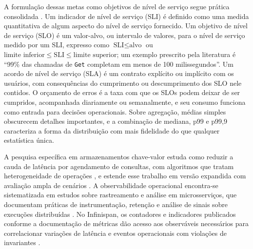 A formulação dessas metas como objetivos de nível de serviço segue prática consolidada \citep{google_sre_slo}. Um indicador de nível de serviço (SLI) é definido como uma medida quantitativa de algum aspecto do nível de serviço fornecido. Um objetivo de nível de serviço (SLO) é um valor-alvo, ou intervalo de valores, para o nível de serviço medido por um SLI, expresso como $\text{SLI} \le \text{alvo}$ ou $\text{limite inferior} \le \text{SLI} \le \text{limite superior}$; um exemplo prescrito pela literatura é ``99\% das chamadas de \texttt{Get} completam em menos de 100 milissegundos''. Um acordo de nível de serviço (SLA) é um contrato explícito ou implícito com os usuários, com consequências do cumprimento ou descumprimento dos SLO nele contidos. O orçamento de erros é a taxa com que os SLOs podem deixar de ser cumpridos, acompanhada diariamente ou semanalmente, e seu consumo funciona como entrada para decisões operacionais. Sobre agregação, médias simples obscurecem detalhes importantes, e a combinação de mediana, p99 e p99,9 caracteriza a forma da distribuição com mais fidelidade do que qualquer estatística única.

A pesquisa específica em armazenamentos chave-valor estuda como reduzir a cauda de latência por agendamento de consultas, com algoritmos que tratam heterogeneidade de operações \citep{jaiman_tailx_2020, benmokhtar_taming_tail_2021}, e estende esse trabalho em versão expandida com avaliação ampla de cenários \citep{benmokhtar_scheduling_2024}. A observabilidade operacional encontra-se sistematizada em estudos sobre rastreamento e análise em microsserviços, que documentam práticas de instrumentação, retenção e análise de sinais sobre execuções distribuídas \citep{li_observability_2021}. No Infinispan, os contadores e indicadores publicados conforme a documentação de métricas dão acesso aos observáveis necessários para correlacionar variações de latência e eventos operacionais com violações de invariantes \citep{infinispan_metrics}.

